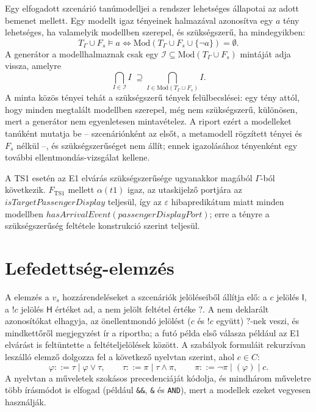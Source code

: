 Egy elfogadott szcenárió tanúmodelljei a rendszer lehetséges állapotai az adott bemenet mellett. Egy modellt igaz tényeinek halmazával azonosítva egy $a$ tény lehetséges, ha valamelyik modellben szerepel, és szükségszerű, ha mindegyikben:
\begin{equation}
T_\Gamma \cup F_s \models a \iff \mathrm{Mod}(T_\Gamma \cup F_s \cup \{\neg a\}) = \emptyset. \label{eq:impl-necessary}
\end{equation}
A generátor a modellhalmaznak csak egy $\mathcal{I} \subseteq \mathrm{Mod}(T_\Gamma \cup F_s)$ mintáját adja vissza, amelyre
\begin{equation}
\bigcap_{I \in \mathcal{I}} I \;\supseteq \bigcap_{I \in \mathrm{Mod}(T_\Gamma \cup F_s)} I. \label{eq:impl-sample}
\end{equation}
A minta közös tényei tehát a szükségszerű tények felülbecslései: egy tény attól, hogy minden megtalált modellben szerepel, még nem szükségszerű, különösen, mert a generátor nem egyenletesen mintavételez. A riport ezért a modelleket tanúként mutatja be -- szcenáriónként az elsőt, a metamodell rögzített tényei és $F_s$ nélkül --, és szükségszerűséget nem állít; ennek igazolásához tényenként egy további ellentmondás-vizsgálat kellene.

A TS1 esetén az E1 elvárás szükségszerűsége ugyanakkor magából $\Gamma$-ból következik. $F_{\mathrm{TS1}}$ mellett $\alpha(\mathit{t1})$ igaz, az utaskijelző portjára az $\mathit{isTargetPassengerDisplay}$ teljesül, így az $\varepsilon$ hibapredikátum miatt minden modellben $\mathit{hasArrivalEvent}(\mathit{passengerDisplayPort})$; erre a tényre a szükségszerűség feltétele konstrukció szerint teljesül.


\section{Lefedettség-elemzés}
\label{sec:impl-coverage}

A  elemzés a $v_s$ hozzárendeléseket a szcenáriók jelöléseiből állítja elő: a $c$ jelölés $\mathsf{I}$, a $!c$ jelölés $\mathsf{H}$ értéket ad, a nem jelölt feltétel értéke $\mathsf{?}$. A nem deklarált azonosítókat elhagyja, az önellentmondó jelölést ($c$ és $!c$ együtt) $\mathsf{?}$-nek veszi, és mindkettőről megjegyzést ír a riportba; a futó példa első válasza például az E1 elvárást is feltüntette a feltételjelölések között. A szabályok formuláit rekurzívan leszálló elemző dolgozza fel a következő nyelvtan szerint, ahol $c \in C$:
\begin{equation*}
\varphi \mathrel{::=} \tau \mid \varphi \lor \tau, \qquad
\tau \mathrel{::=} \pi \mid \tau \land \pi, \qquad
\pi \mathrel{::=} \neg\pi \mid (\varphi) \mid c.
\end{equation*}
A nyelvtan a műveletek szokásos precedenciáját kódolja, és mindhárom műveletre több írásmódot is elfogad (például \texttt{\&\&}, \texttt{\&} és \texttt{AND}), mert a modellek ezeket vegyesen használják.

